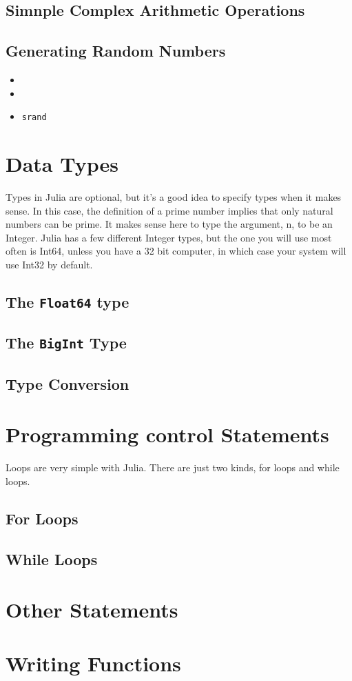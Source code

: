 \subsection{Simnple Complex Arithmetic Operations}

\subsection{Generating Random Numbers}

\begin{itemize}
\item
\item
\item \texttt{srand}
\end{itemize}

\section{Data Types}
Types in Julia are optional, but it's a good idea to specify types when it makes sense. In this case, the definition of a prime number implies that only natural numbers can be prime. It makes sense here to type the argument, n, to be an Integer. Julia has a few different Integer types, but the one you will use most often is Int64, unless you have a 32 bit computer, 
in which case your system will use Int32 by default.
\subsection{The \texttt{Float64} type }
\subsection{The \texttt{BigInt} Type}

\subsection{Type Conversion}
\newpage
\section{Programming control Statements}
Loops are very simple with Julia. There are just two kinds, for loops and while loops.
\subsection{For Loops}

\subsection{While Loops}

\section{Other Statements}


\newpage
\section{Writing Functions}
